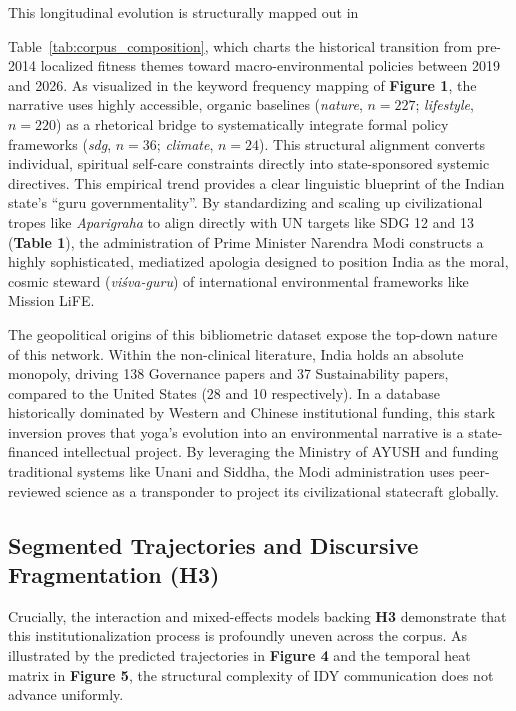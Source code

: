 \documentclass[11pt]{article}
\begin{document}
This longitudinal evolution is structurally mapped out in {Table~\ref{tab:corpus_composition}, which charts the historical transition from pre-2014 localized fitness themes toward macro-environmental policies between 2019 and 2026. As visualized in the keyword frequency mapping of \textbf{Figure 1}, the narrative uses highly accessible, organic baselines (\textit{nature}, $n=227$; \textit{lifestyle}, $n=220$) as a rhetorical bridge to systematically integrate formal policy frameworks (\textit{sdg}, $n=36$; \textit{climate}, $n=24$). This structural alignment converts individual, spiritual self-care constraints directly into state-sponsored systemic directives. This empirical trend provides a clear linguistic blueprint of the Indian state's ``guru governmentality''. By standardizing and scaling up civilizational tropes like \textit{Aparigraha} to align directly with UN targets like SDG 12 and 13 (\textbf{Table 1}), the administration of Prime Minister Narendra Modi constructs a highly sophisticated, mediatized apologia designed to position India as the moral, cosmic steward (\textit{vi\'{s}va-guru}) of international environmental frameworks like Mission LiFE.

The geopolitical origins of this bibliometric dataset expose the top-down nature of this network. Within the non-clinical literature, India holds an absolute monopoly, driving 138 Governance papers and 37 Sustainability papers, compared to the United States (28 and 10 respectively). In a database historically dominated by Western and Chinese institutional funding, this stark inversion proves that yoga's evolution into an environmental narrative is a state-financed intellectual project. By leveraging the Ministry of AYUSH and funding traditional systems like Unani and Siddha, the Modi administration uses peer-reviewed science as a transponder to project its civilizational statecraft globally.

\subsection{Segmented Trajectories and Discursive Fragmentation (H3)}
Crucially, the interaction and mixed-effects models backing \textbf{H3} demonstrate that this institutionalization process is profoundly uneven across the corpus. As illustrated by the predicted trajectories in \textbf{Figure 4} and the temporal heat matrix in \textbf{Figure 5}, the structural complexity of IDY communication does not advance uniformly. 

}
\end{document}
